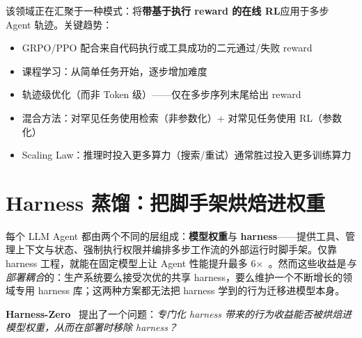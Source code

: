 \begin{intuitionbox}[未来：RL + Agent]
该领域正在汇聚于一种模式：将\textbf{带基于执行 reward 的在线 RL}应用于多步 Agent 轨迹。关键趋势：

\begin{itemize}
  \item GRPO/PPO 配合来自代码执行或工具成功的二元通过/失败 reward
  \item 课程学习：从简单任务开始，逐步增加难度
  \item 轨迹级优化（而非 Token 级）——仅在多步序列末尾给出 reward
  \item 混合方法：对罕见任务使用检索（非参数化）+ 对常见任务使用 RL（参数化）
  \item Scaling Law：推理时投入更多算力（搜索/重试）通常胜过投入更多训练算力
\end{itemize}
\end{intuitionbox}

\newpage
\section{Harness 蒸馏：把脚手架烘焙进权重}
\label{sec:harness-distillation}

每个 LLM Agent 都由两个不同的层组成：\textbf{模型权重}与 \textbf{harness}——提供工具、管理上下文与状态、强制执行权限并编排多步工作流的外部运行时脚手架。仅靠 harness 工程，就能在固定模型上让 Agent 性能提升最多 6$\times$~\cite{ye2026harnesszero}。然而这些收益是\emph{与部署耦合}的：生产系统要么接受次优的共享 harness，要么维护一个不断增长的领域专用 harness 库；这两种方案都无法把 harness 学到的行为迁移进模型本身。

\textbf{Harness-Zero}~\cite{ye2026harnesszero} 提出了一个问题：\emph{专门化 harness 带来的行为收益能否被烘焙进模型权重，从而在部署时移除 harness？}

